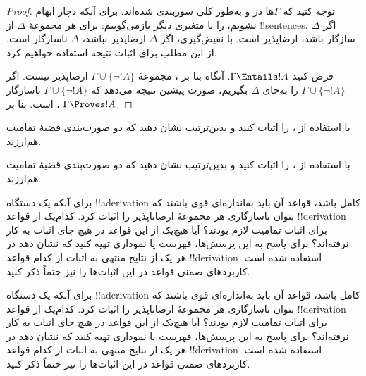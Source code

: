 \documentclass[../../../include/open-logic-section]{subfiles}
\begin{document}
\begin{proof}
توجه کنید که $\Gamma$ها در  و
 به‌طور کلی سوربندی شده‌اند. برای آنکه دچار
ابهام نشویم،  را با متغیری دیگر بازمی‌گوییم:
برای هر مجموعهٔ $\Delta$ از !!{sentence}s، اگر $\Delta$ سازگار باشد،
ارضاپذیر است. با نقیض‌گیری، اگر $\Delta$ ارضاپذیر نباشد، $\Delta$
ناسازگار است.
از این مطلب برای اثبات نتیجه استفاده خواهیم کرد.

فرض کنید $\Gamma \Entails !A$. آنگاه بنا بر
، مجموعهٔ
$\Gamma \cup \{\lnot !A\}$ ارضاپذیر نیست. اگر $\Gamma \cup \{\lnot
!A\}$ را به‌جای $\Delta$ بگیریم، صورت پیشین
 نتیجه می‌دهد که $\Gamma \cup \{\lnot !A\}$
ناسازگار است. بنا بر
،
$\Gamma \Proves !A$.
\end{proof}

\begin{prob}
با استفاده از ،
 را اثبات کنید و بدین‌ترتیب نشان
دهید که دو صورت‌بندی قضیهٔ تمامیت هم‌ارزند.
\end{prob}
\tagendprob

\begin{prob}
با استفاده از ،
 را اثبات کنید و بدین‌ترتیب نشان
دهید که دو صورت‌بندی قضیهٔ تمامیت هم‌ارزند.
\end{prob}
\tagendprob

\begin{prob}
برای آنکه یک دستگاه !!a{derivation} کامل باشد، قواعد آن باید به‌اندازه‌ای
قوی باشند که بتوان ناسازگاری هر مجموعهٔ ارضاناپذیر را اثبات کرد. کدام‌یک
از قواعد !!{derivation} برای اثبات تمامیت لازم بودند؟ آیا هیچ‌یک از این
قواعد در هیچ جای اثبات به کار نرفته‌اند؟ برای پاسخ به این پرسش‌ها، فهرست
یا نموداری تهیه کنید که نشان دهد در هر یک از نتایج منتهی به اثبات
 از کدام قواعد !!{derivation}
استفاده شده است. کاربردهای ضمنی قواعد در این اثبات‌ها را نیز حتماً ذکر کنید.
\end{prob}
\tagendprob

\begin{prob}
برای آنکه یک دستگاه !!a{derivation} کامل باشد، قواعد آن باید به‌اندازه‌ای
قوی باشند که بتوان ناسازگاری هر مجموعهٔ ارضاناپذیر را اثبات کرد. کدام‌یک
از قواعد !!{derivation} برای اثبات تمامیت لازم بودند؟ آیا هیچ‌یک از این
قواعد در هیچ جای اثبات به کار نرفته‌اند؟ برای پاسخ به این پرسش‌ها، فهرست
یا نموداری تهیه کنید که نشان دهد در هر یک از نتایج منتهی به اثبات
 از کدام قواعد !!{derivation}
استفاده شده است. کاربردهای ضمنی قواعد در این اثبات‌ها را نیز حتماً ذکر کنید.
\end{prob}
\tagendprob
\end{document}
